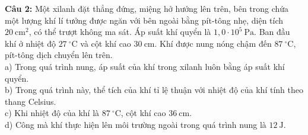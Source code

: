 \documentclass[12pt,a4paper]{article}
\begin{document}
\begin{minipage}{\textwidth}
\noindent \textbf{Câu 2:} Một xilanh đặt thẳng đứng, miệng hở hướng lên trên, bên trong chứa một lượng khí lí tưởng được ngăn với bên ngoài bằng pít-tông nhẹ, diện tích $20\ \text{cm}^2$, có thể trượt không ma sát. Áp suất khí quyển là $1{,}0 \cdot 10^{5}\ \text{Pa}$. Ban đầu khí ở nhiệt độ $27\ ^{\circ}\text{C}$ và cột khí cao $30\ \text{cm}$. Khí được nung nóng chậm đến $87\ ^{\circ}\text{C}$, pít-tông dịch chuyển lên trên.\\
\noindent a) Trong quá trình nung, áp suất của khí trong xilanh luôn bằng áp suất khí quyển.\\

\noindent b) Trong quá trình này, thể tích của khí tỉ lệ thuận với nhiệt độ của khí tính theo thang Celsius.\\

\noindent c) Khi nhiệt độ của khí là $87\ ^{\circ}\text{C}$, cột khí cao $36\ \text{cm}$.\\

\noindent d) Công mà khí thực hiện lên môi trường ngoài trong quá trình nung là $12\ \text{J}$.
\end{minipage}
\end{document}
